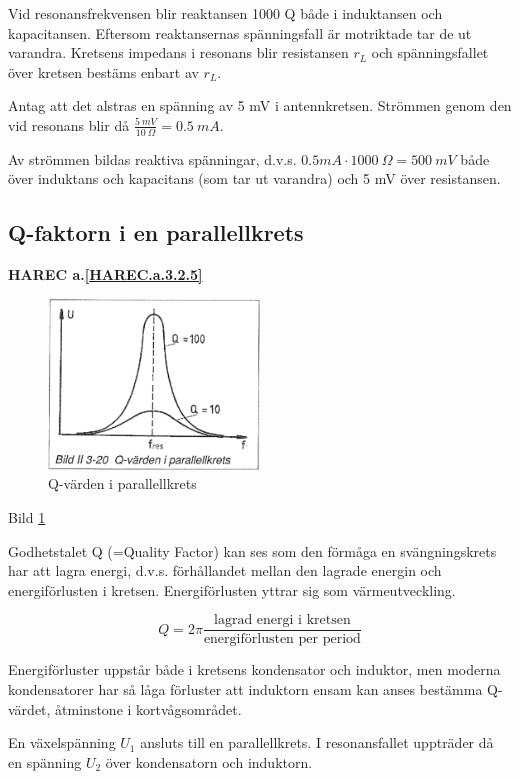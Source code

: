 Vid resonansfrekvensen blir reaktansen 1000 Q både i induktansen och
kapacitansen. Eftersom reaktansernas spänningsfall är motriktade tar de ut
varandra. Kretsens impedans i resonans blir resistansen \(r_L\) och
spänningsfallet över kretsen bestäms enbart av \(r_L\).

Antag att det alstras en spänning av 5 mV i antennkretsen. Strömmen genom den
vid resonans blir då \(\frac{5\ mV}{10\ Ω} = 0.5\ mA\).

Av strömmen bildas reaktiva spänningar, d.v.s.
\(0.5 mA \cdot 1000\ Ω = 500\ mV\) både över induktans och kapacitans (som tar
ut varandra) och 5 mV över resistansen.

\subsection{Q-faktorn i en parallellkrets}
\textbf{HAREC a.\ref{HAREC.a.3.2.5}\label{myHAREC.a.3.2.5}}
\label{Q-faktor}

\begin{figure}
\includegraphics[width=0.5\textwidth]{images/bild_2_3-20}
\caption{Q-värden i parallellkrets}
\label{fig:BildII3-20}
\end{figure}

Bild \ref{fig:BildII3-20}

Godhetstalet Q (=Quality Factor) kan ses som den förmåga en svängningskrets har
att lagra energi, d.v.s. förhållandet mellan den lagrade energin och
energiförlusten i kretsen. Energiförlusten yttrar sig som värmeutveckling.

\[
Q = 2π\frac{\text{lagrad energi i kretsen}}{\text{energiförlusten per period}}
\]

Energiförluster uppstår både i kretsens kondensator och induktor, men moderna
kondensatorer har så låga förluster att induktorn ensam kan anses bestämma
Q-värdet, åtminstone i kortvågsområdet.

En växelspänning \(U_1\) ansluts till en parallellkrets. I resonansfallet
uppträder då en spänning \(U_2\) över kondensatorn och induktorn.

